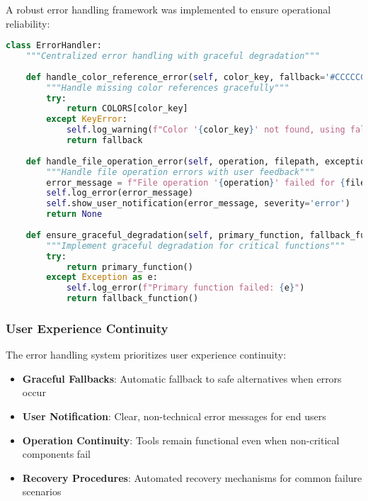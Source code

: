 \documentclass[binding=0.6cm]{sapthesis}
\begin{document}
A robust error handling framework was implemented to ensure operational reliability:

\begin{lstlisting}[language=Python, caption=Enhanced Error Handling Framework]
class ErrorHandler:
    """Centralized error handling with graceful degradation"""
    
    def handle_color_reference_error(self, color_key, fallback='#CCCCCC'):
        """Handle missing color references gracefully"""
        try:
            return COLORS[color_key]
        except KeyError:
            self.log_warning(f"Color '{color_key}' not found, using fallback")
            return fallback
    
    def handle_file_operation_error(self, operation, filepath, exception):
        """Handle file operation errors with user feedback"""
        error_message = f"File operation '{operation}' failed for {filepath}: {exception}"
        self.log_error(error_message)
        self.show_user_notification(error_message, severity='error')
        return None
    
    def ensure_graceful_degradation(self, primary_function, fallback_function):
        """Implement graceful degradation for critical functions"""
        try:
            return primary_function()
        except Exception as e:
            self.log_error(f"Primary function failed: {e}")
            return fallback_function()
\end{lstlisting}

\subsubsection{User Experience Continuity}

The error handling system prioritizes user experience continuity:

\begin{itemize}
    \item \textbf{Graceful Fallbacks}: Automatic fallback to safe alternatives when errors occur
    \item \textbf{User Notification}: Clear, non-technical error messages for end users
    \item \textbf{Operation Continuity}: Tools remain functional even when non-critical components fail
    \item \textbf{Recovery Procedures}: Automated recovery mechanisms for common failure scenarios
\end{itemize}
\end{document}

